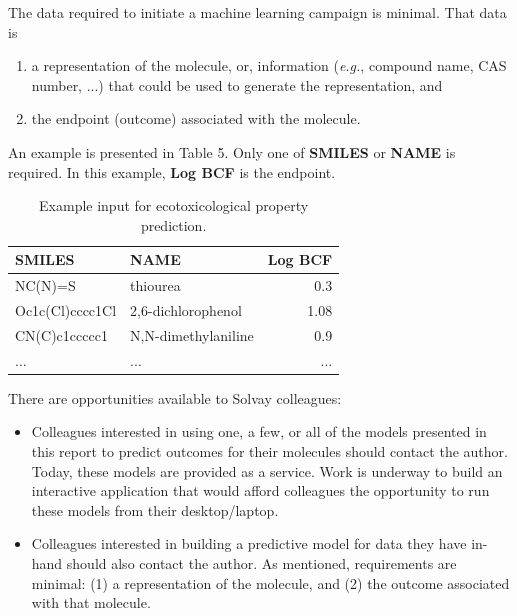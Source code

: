 \documentclass[10pt, letter]{article}
\renewcommand{\=}{\, =\, }
\newcommand{\+}{\, +\, }
\renewcommand{\-}{\, -\, }
\begin{document}
The data required to initiate a machine learning campaign is minimal. That data is
\begin{enumerate}
\item a representation of the molecule, or, information (\textit{e.g.}, compound name, CAS number, ...) that could be used to generate the representation, and
\item the endpoint (outcome) associated with the molecule.
\end{enumerate}
An example is presented in Table 5. Only one of \textbf{SMILES} or \textbf{NAME} is required. In this example, \textbf{Log BCF} is the endpoint.

\begin{table}[H]
\begin{center}
\begin{tabular}{llr}
{\bf SMILES} & {\bf NAME} & {\bf Log BCF} \\
\midrule
NC(N)=S  &   thiourea & 0.3 \\
Oc1c(Cl)cccc1Cl  &  2,6-dichlorophenol & 1.08 \\
CN(C)c1ccccc1  &  N,N-dimethylaniline & 0.9 \\
...  &  ... &  ... \\
\bottomrule
\end{tabular}
\end{center}
\caption{Example input for ecotoxicological property prediction.}
\end{table}

There are opportunities available to Solvay colleagues:
\begin{itemize}
\item Colleagues interested in using one, a few, or all of the  models presented in this report to predict outcomes for their molecules should contact the author. Today, these models are provided as a service. Work is underway to build an interactive application that would afford  colleagues the opportunity to run these models from their desktop/laptop.
\item Colleagues interested in building a predictive model for data they have in-hand should also contact the author. As mentioned, requirements are minimal: (1) a representation of the molecule, and (2) the outcome associated with that molecule.
\end{itemize}
\end{document}
